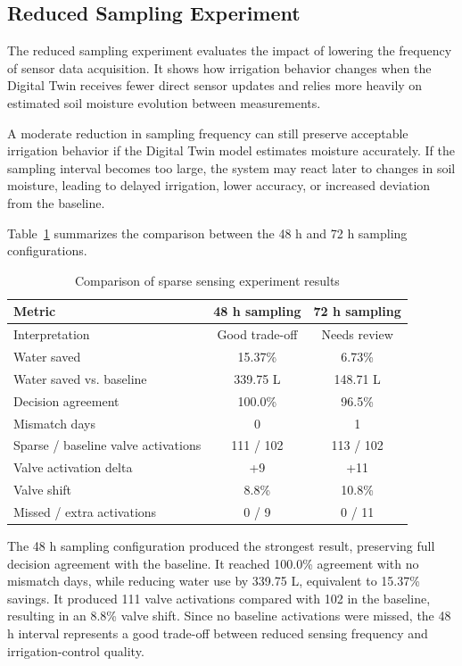 \subsection{Reduced Sampling Experiment}

\par The reduced sampling experiment evaluates the impact of lowering the frequency of
    sensor data acquisition. It shows how irrigation behavior changes when the Digital
    Twin receives fewer direct sensor updates and relies more heavily on estimated soil
    moisture evolution between measurements.

\par A moderate reduction in sampling frequency can still preserve acceptable irrigation
    behavior if the Digital Twin model estimates moisture accurately. If the sampling
    interval becomes too large, the system may react later to changes in soil moisture,
    leading to delayed irrigation, lower accuracy, or increased deviation from the
    baseline.

\par Table~\ref{sparse_sensing_comparison} summarizes the comparison between the 48 h and
    72 h sampling configurations.

\begin{table}[htbp]
\centering
\caption{Comparison of sparse sensing experiment results}
\label{sparse_sensing_comparison}
\begin{tabular}{lcc}
\toprule
\textbf{Metric} & \textbf{48 h sampling} & \textbf{72 h sampling} \\
\midrule
Interpretation & Good trade-off & Needs review \\
Water saved & 15.37\% & 6.73\% \\
Water saved vs. baseline & 339.75 L & 148.71 L \\
Decision agreement & 100.0\% & 96.5\% \\
Mismatch days & 0 & 1 \\
Sparse / baseline valve activations & 111 / 102 & 113 / 102 \\
Valve activation delta & +9 & +11 \\
Valve shift & 8.8\% & 10.8\% \\
Missed / extra activations & 0 / 9 & 0 / 11 \\
\bottomrule
\end{tabular}
\end{table}

\par The 48 h sampling configuration produced the strongest result, preserving full
    decision agreement with the baseline. It reached 100.0\% agreement with no mismatch
    days, while reducing water use by 339.75 L, equivalent to 15.37\% savings. It produced
    111 valve activations compared with 102 in the baseline, resulting in an 8.8\% valve
    shift. Since no baseline activations were missed, the 48 h interval represents a good
    trade-off between reduced sensing frequency and irrigation-control quality.

